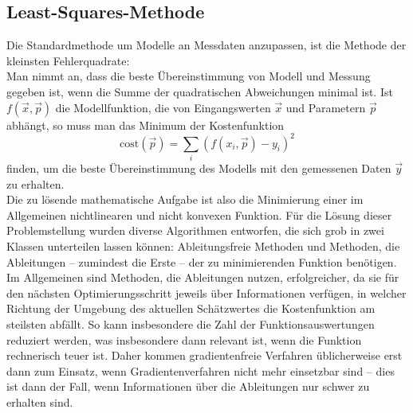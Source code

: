 \documentclass{scrartcl}
\begin{document}
\subsection{Least-Squares-Methode}
Die Standardmethode um Modelle an Messdaten anzupassen, ist die Methode der kleinsten Fehlerquadrate:\\
Man nimmt an, dass die beste Übereinstimmung von Modell und Messung gegeben ist, wenn die Summe der quadratischen Abweichungen minimal ist. Ist $f(\vec x, \vec p)$ die Modellfunktion, die von Eingangswerten $\vec x$ und Parametern $\vec p$ abhängt, so muss man das Minimum der Kostenfunktion
\begin{equation}
	\text{cost}(\vec p) = \sum_i \left(f(x_i, \vec p)-y_i\right)^2
\end{equation}
finden, um die beste Übereinstimmung des Modells mit den gemessenen Daten $\vec y$ zu erhalten.\\
Die zu lösende mathematische Aufgabe ist also die Minimierung einer im Allgemeinen nichtlinearen und nicht konvexen Funktion. Für die Lösung dieser Problemstellung wurden diverse Algorithmen entworfen, die sich grob in zwei Klassen unterteilen lassen können: Ableitungsfreie Methoden und Methoden, die  Ableitungen -- zumindest die Erste -- der zu minimierenden Funktion benötigen.\\
Im Allgemeinen sind Methoden, die Ableitungen nutzen, erfolgreicher, da sie für den nächsten Optimierungsschritt jeweils über Informationen verfügen, in welcher Richtung der Umgebung des aktuellen Schätzwertes die Kostenfunktion am steilsten abfällt. So kann insbesondere die Zahl der Funktionsauswertungen reduziert werden, was insbesondere dann relevant ist, wenn die Funktion rechnerisch teuer ist. Daher kommen gradientenfreie Verfahren üblicherweise erst dann zum Einsatz, wenn Gradientenverfahren nicht mehr einsetzbar sind -- dies ist dann der Fall, wenn Informationen über die Ableitungen nur schwer zu erhalten sind.
\end{document}
